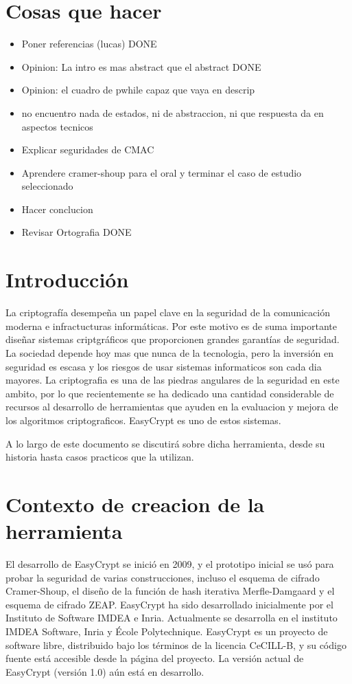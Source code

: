\documentclass[runningheads,a4paper]{llncs}
\begin{document}
\section{Cosas que hacer}

\begin{itemize}
	\item Poner referencias (lucas) DONE
	\item Opinion: La intro es mas abstract que el abstract DONE
	\item Opinion: el cuadro de pwhile capaz que vaya en descrip
	\item no encuentro nada de estados, ni de abstraccion, ni que respuesta da en aspectos tecnicos
	\item Explicar seguridades de CMAC
	\item Aprendere cramer-shoup para el oral y terminar el caso de estudio seleccionado
	\item Hacer conclucion
	\item Revisar Ortografia DONE
\end{itemize}

\section{Introducción}
La criptografía desempeña un papel clave en la seguridad de la comunicación moderna e infractucturas informáticas.  Por este motivo es de suma importante diseñar sistemas criptgráficos que proporcionen grandes garantías de seguridad.
La sociedad depende hoy mas que nunca de la tecnologia, pero la inversión en seguridad es escasa y los riesgos de usar sistemas informaticos son cada dia mayores. La criptografia es una de las piedras angulares de la seguridad en este  ambito, por lo que recientemente se ha dedicado una cantidad considerable de recursos al desarrollo de herramientas que ayuden en la evaluacion y mejora de los algoritmos criptograficos. EasyCrypt es uno de estos sistemas. 

    A lo largo de este documento se discutirá sobre dicha herramienta, desde su historia hasta casos practicos que la utilizan.
    
\section{Contexto de creacion de la herramienta}
El desarrollo de EasyCrypt se inició en 2009, y el prototipo inicial se usó para probar la seguridad de varias construcciones, incluso el esquema de cifrado Cramer-Shoup, el diseño de la función de hash iterativa Merfle-Damgaard y el esquema de cifrado ZEAP. EasyCrypt ha sido desarrollado inicialmente por el Instituto de Software IMDEA e Inria. Actualmente se desarrolla en el instituto IMDEA Software, Inria y École Polytechnique. EasyCrypt es un proyecto de software libre, distribuido bajo los términos de la licencia CeCILL-B, y su código fuente está accesible desde la página del proyecto. 
La versión actual de EasyCrypt (versión 1.0) aún está en desarrollo. 
\cite{article3}
\end{document}
